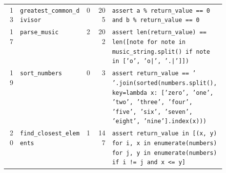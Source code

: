 \begin{footnotesize}
\begin{longtable}{@{}r l r r p{0.52\linewidth}@{}}
13 & \texttt{greatest\_common\_divisor} & 0 & 205 & \texttt{assert \allowbreak{}a \allowbreak{}\% \allowbreak{}return\_value \allowbreak{}=\allowbreak{}=\allowbreak{} \allowbreak{}0 \allowbreak{}and \allowbreak{}b \allowbreak{}\% \allowbreak{}return\_value \allowbreak{}=\allowbreak{}=\allowbreak{} \allowbreak{}0} \\
17 & \texttt{parse\_music} & 2 & 202 & \texttt{assert \allowbreak{}len(\allowbreak{}return\_value)\allowbreak{} \allowbreak{}=\allowbreak{}=\allowbreak{} \allowbreak{}len(\allowbreak{}[\allowbreak{}note \allowbreak{}for \allowbreak{}note \allowbreak{}in \allowbreak{}music\_string.\allowbreak{}split(\allowbreak{})\allowbreak{} \allowbreak{}if \allowbreak{}note \allowbreak{}in \allowbreak{}[\allowbreak{}'\allowbreak{}o'\allowbreak{},\allowbreak{} \allowbreak{}'\allowbreak{}o|\allowbreak{}'\allowbreak{},\allowbreak{} \allowbreak{}'\allowbreak{}.\allowbreak{}|\allowbreak{}'\allowbreak{}]\allowbreak{}]\allowbreak{})\allowbreak{}} \\
19 & \texttt{sort\_numbers} & 0 & 3 & \texttt{assert \allowbreak{}return\_value \allowbreak{}=\allowbreak{}=\allowbreak{} \allowbreak{}'\allowbreak{} \allowbreak{}'\allowbreak{}.\allowbreak{}join(\allowbreak{}sorted(\allowbreak{}numbers.\allowbreak{}split(\allowbreak{})\allowbreak{},\allowbreak{} \allowbreak{}key=\allowbreak{}lambda \allowbreak{}x:\allowbreak{} \allowbreak{}[\allowbreak{}'\allowbreak{}zero'\allowbreak{},\allowbreak{} \allowbreak{}'\allowbreak{}one'\allowbreak{},\allowbreak{} \allowbreak{}'\allowbreak{}two'\allowbreak{},\allowbreak{} \allowbreak{}'\allowbreak{}three'\allowbreak{},\allowbreak{} \allowbreak{}'\allowbreak{}four'\allowbreak{},\allowbreak{} \allowbreak{}'\allowbreak{}five'\allowbreak{},\allowbreak{} \allowbreak{}'\allowbreak{}six'\allowbreak{},\allowbreak{} \allowbreak{}'\allowbreak{}seven'\allowbreak{},\allowbreak{} \allowbreak{}'\allowbreak{}eight'\allowbreak{},\allowbreak{} \allowbreak{}'\allowbreak{}nine'\allowbreak{}]\allowbreak{}.\allowbreak{}index(\allowbreak{}x)\allowbreak{})\allowbreak{})\allowbreak{}} \\
20 & \texttt{find\_closest\_elements} & 1 & 147 & \texttt{assert \allowbreak{}return\_value \allowbreak{}in \allowbreak{}[\allowbreak{}(\allowbreak{}x,\allowbreak{} \allowbreak{}y)\allowbreak{} \allowbreak{}for \allowbreak{}i,\allowbreak{} \allowbreak{}x \allowbreak{}in \allowbreak{}enumerate(\allowbreak{}numbers)\allowbreak{} \allowbreak{}for \allowbreak{}j,\allowbreak{} \allowbreak{}y \allowbreak{}in \allowbreak{}enumerate(\allowbreak{}numbers)\allowbreak{} \allowbreak{}if \allowbreak{}i \allowbreak{}!=\allowbreak{} \allowbreak{}j \allowbreak{}and \allowbreak{}x \allowbreak{}<\allowbreak{}=\allowbreak{} \allowbreak{}y]\allowbreak{}} \\

\end{longtable}
\end{footnotesize}
